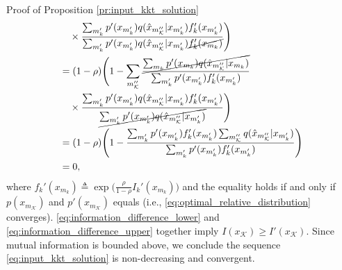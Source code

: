 \documentclass[journal]{IEEEtran}
\begin{document}
\begin{appendix}
\begin{subsection}{Proof of Proposition \ref{pr:input_kkt_solution}}
\begin{subequations}
\begin{align}
				 & \quad \times \frac{\sum_{m_k'} p'(x_{m_k'}) q(\hat{x}_{m_{\mathcal{K}}''}|x_{m_k'}) f_k'(x_{m_k'})}{\sum_{m_k'} p'(x_{m_k'}) q(\hat{x}_{m_{\mathcal{K}}''}|x_{m_k'}) \cancel{f_k'(x_{m_k})}} \Biggr)                       \\
				 & = (1 - \rho) \Biggl( 1 - \sum_{m_{\mathcal{K}}''} \frac{\cancel{\sum_{m_k} p'(x_{m_k}) q(\hat{x}_{m_{\mathcal{K}}''}|x_{m_k})}}{\sum_{m_k'} p'(x_{m_k'}) f_k'(x_{m_k'})}                                        \nonumber  \\
				 & \quad \times \frac{\sum_{m_k'} p'(x_{m_k'}) q(\hat{x}_{m_{\mathcal{K}}''}|x_{m_k'}) f_k'(x_{m_k'})}{\cancel{\sum_{m_k'} p'(x_{m_k'}) q(\hat{x}_{m_{\mathcal{K}}''}|x_{m_k'})}} \Biggr)                                     \\
				 & = (1 - \rho) \Biggl( 1 - \frac{\sum_{m_k'} p'(x_{m_k'}) f_k'(x_{m_k'}) \sum_{m_{\mathcal{K}}''} q(\hat{x}_{m_{\mathcal{K}}''}|x_{m_k'})}{\sum_{m_k'} p'(x_{m_k'}) f_k'(x_{m_k'})} \Biggr)                        \nonumber \\
				 & = 0,
			\end{align}
		\end{subequations}
		where $f_k'(x_{m_k}) \triangleq \exp \bigl( \frac{\rho}{1 - \rho} I_k'(x_{m_k}) \bigr)$ and the equality holds if and only if $p(x_{m_{\mathcal{K}}})$ and $p'(x_{m_{\mathcal{K}}})$ equals (i.e., \eqref{eq:optimal_relative_distribution} converges).
		\eqref{eq:information_difference_lower} and \eqref{eq:information_difference_upper} together imply $I(x_{\mathcal{K}}) \ge I'(x_{\mathcal{K}})$.
		Since mutual information is bounded above, we conclude the sequence \eqref{eq:input_kkt_solution} is non-decreasing and convergent.


\end{subsection}
\end{appendix}
\end{document}
